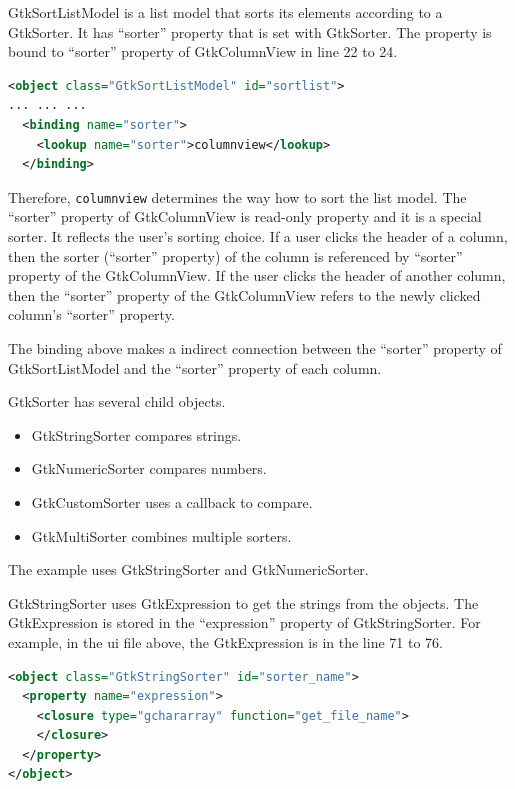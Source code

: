 GtkSortListModel is a list model that sorts its elements according to a
GtkSorter. It has ``sorter'' property that is set with GtkSorter. The
property is bound to ``sorter'' property of GtkColumnView in line 22 to
24.

\begin{lstlisting}[language=XML]
<object class="GtkSortListModel" id="sortlist">
... ... ...
  <binding name="sorter">
    <lookup name="sorter">columnview</lookup>
  </binding>
\end{lstlisting}

Therefore, \passthrough{\lstinline!columnview!} determines the way how
to sort the list model. The ``sorter'' property of GtkColumnView is
read-only property and it is a special sorter. It reflects the user's
sorting choice. If a user clicks the header of a column, then the sorter
(``sorter'' property) of the column is referenced by ``sorter'' property
of the GtkColumnView. If the user clicks the header of another column,
then the ``sorter'' property of the GtkColumnView refers to the newly
clicked column's ``sorter'' property.

The binding above makes a indirect connection between the ``sorter''
property of GtkSortListModel and the ``sorter'' property of each column.

GtkSorter has several child objects.

\begin{itemize}
\tightlist
\item
  GtkStringSorter compares strings.
\item
  GtkNumericSorter compares numbers.
\item
  GtkCustomSorter uses a callback to compare.
\item
  GtkMultiSorter combines multiple sorters.
\end{itemize}

The example uses GtkStringSorter and GtkNumericSorter.

GtkStringSorter uses GtkExpression to get the strings from the objects.
The GtkExpression is stored in the ``expression'' property of
GtkStringSorter. For example, in the ui file above, the GtkExpression is
in the line 71 to 76.

\begin{lstlisting}[language=XML]
<object class="GtkStringSorter" id="sorter_name">
  <property name="expression">
    <closure type="gchararray" function="get_file_name">
    </closure>
  </property>
</object>
\end{lstlisting}

